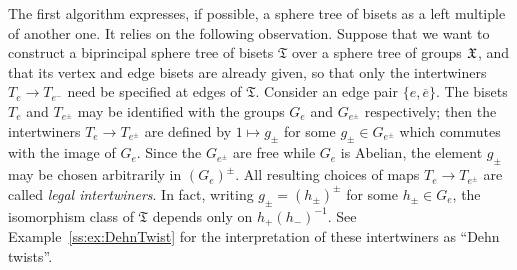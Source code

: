 \documentclass{amsart}
\begin{document}
The first algorithm expresses, if possible, a sphere tree of bisets as
a left multiple of another one. It relies on the following
observation. Suppose that we want to construct a biprincipal sphere
tree of bisets $\mathfrak T$ over a sphere tree of groups ${\mathfrak X}$, and
that its vertex and edge bisets are already given, so that only the
intertwiners $T_e\to T_{e^-}$ need be specified at edges of
$\mathfrak T$. Consider an edge pair $\{e,\overline e\}$. The bisets
$T_e$ and $T_{e^\pm}$ may be identified with the groups $G_e$ and
$G_{e^\pm}$ respectively; then the intertwiners $T_e\to T_{e^\pm}$ are
defined by $1\mapsto g_\pm$ for some $g_\pm\in G_{e^\pm}$ which
commutes with the image of $G_e$. Since the $G_{e^\pm}$ are free while
$G_e$ is Abelian, the element $g_\pm$ may be chosen arbitrarily in
$(G_e)^\pm$. All resulting choices of maps $T_e\to T_{e^\pm}$ are
called \emph{legal intertwiners}. In fact, writing $g_\pm=(h_\pm)^\pm$
for some $h_\pm\in G_e$, the isomorphism class of $\mathfrak T$
depends only on $h_+(h_-)^{-1}$. See Example~\ref{ss:ex:DehnTwist} for
the interpretation of these intertwiners as ``Dehn twists''.
\end{document}
